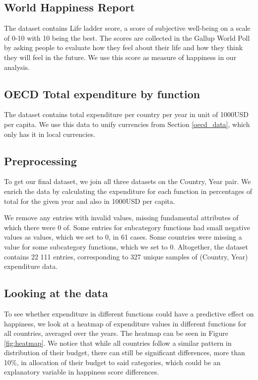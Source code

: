 \documentclass{article}
\begin{document}
\subsection{World Happiness Report}

The dataset contains Life ladder score, a score of subjective well-being on a scale of 0-10 with 10 being the best. The scores are collected in the Gallup World Poll \cite{worldpoll} by asking people to evaluate how they feel about their life and how they think they will feel in the future. We use this score as measure of happiness in our analysis.

\subsection{OECD Total expenditure by function}

The dataset contains total expenditure per country per year in unit of 1000USD per capita. We use this data to unify currencies from Section \ref{oecd_data}, which only has it in local currencies.

\subsection{Preprocessing}
To get our final dataset, we join all three datasets on the Country, Year pair. We enrich the data by calculating the expenditure for each function in percentages of total for the given year and also in 1000USD per capita.

We remove any entries with invalid values, missing fundamental attributes of which there were 0 of. Some entries for subcategory functions had small negative values as values, which we set to 0, in 61 cases. Some countries were missing a value for some subcategory functions, which we set to 0. Altogether, the dataset contains 22 111 entries, corresponding to 327 unique samples of (Country, Year) expenditure data.

\subsection{Looking at the data}
To see whether expenditure in different functions could have a predictive effect on happiness, we look at a heatmap of expenditure values in different functions for all countries, averaged over the years. The heatmap can be seen in Figure \ref{fig:heatmap}. We notice that while all countries follow a similar pattern in distribution of their budget, there can still be significant differences, more than 10\%, in allocation of their budget to said categories, which could be an explanatory variable in happiness score differences.
\end{document}
